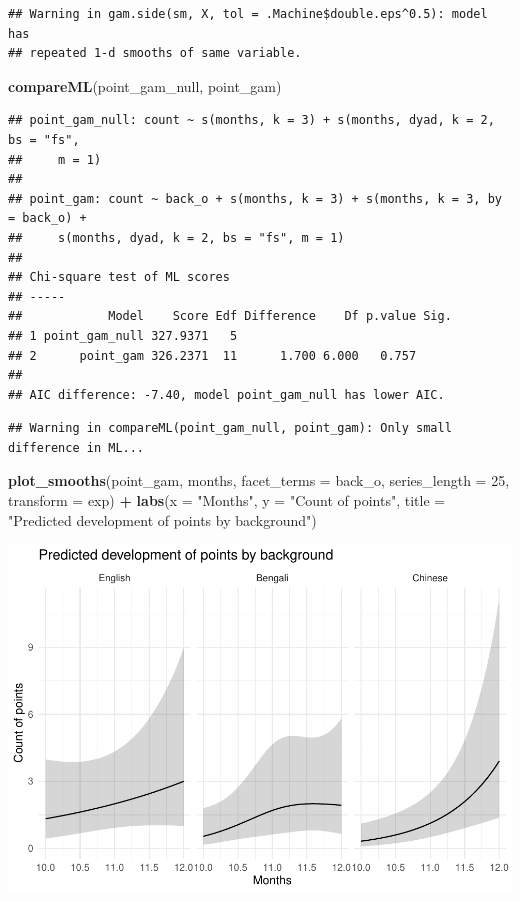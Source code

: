\documentclass[]{article}
\newenvironment{Shaded}{\begin{snugshade}}{\end{snugshade}}
\newcommand{\DataTypeTok}[1]{\textcolor[rgb]{0.13,0.29,0.53}{#1}}
\newcommand{\DecValTok}[1]{\textcolor[rgb]{0.00,0.00,0.81}{#1}}
\newcommand{\KeywordTok}[1]{\textcolor[rgb]{0.13,0.29,0.53}{\textbf{#1}}}
\newcommand{\NormalTok}[1]{#1}
\newcommand{\OperatorTok}[1]{\textcolor[rgb]{0.81,0.36,0.00}{\textbf{#1}}}
\newcommand{\StringTok}[1]{\textcolor[rgb]{0.31,0.60,0.02}{#1}}
\begin{document}
\begin{verbatim}
## Warning in gam.side(sm, X, tol = .Machine$double.eps^0.5): model has
## repeated 1-d smooths of same variable.
\end{verbatim}

\begin{Shaded}
\begin{Highlighting}[]
\KeywordTok{compareML}\NormalTok{(point_gam_null, point_gam)}
\end{Highlighting}
\end{Shaded}

\begin{verbatim}
## point_gam_null: count ~ s(months, k = 3) + s(months, dyad, k = 2, bs = "fs", 
##     m = 1)
## 
## point_gam: count ~ back_o + s(months, k = 3) + s(months, k = 3, by = back_o) + 
##     s(months, dyad, k = 2, bs = "fs", m = 1)
## 
## Chi-square test of ML scores
## -----
##            Model    Score Edf Difference    Df p.value Sig.
## 1 point_gam_null 327.9371   5                              
## 2      point_gam 326.2371  11      1.700 6.000   0.757     
## 
## AIC difference: -7.40, model point_gam_null has lower AIC.
\end{verbatim}

\begin{verbatim}
## Warning in compareML(point_gam_null, point_gam): Only small difference in ML...
\end{verbatim}

\begin{Shaded}
\begin{Highlighting}[]
\KeywordTok{plot_smooths}\NormalTok{(point_gam, months, }\DataTypeTok{facet_terms =}\NormalTok{ back_o, }\DataTypeTok{series_length =} \DecValTok{25}\NormalTok{, }\DataTypeTok{transform =}\NormalTok{ exp) }\OperatorTok{+}
\StringTok{  }\KeywordTok{labs}\NormalTok{(}\DataTypeTok{x =} \StringTok{"Months"}\NormalTok{, }\DataTypeTok{y =} \StringTok{"Count of points"}\NormalTok{, }\DataTypeTok{title =} \StringTok{"Predicted development of points by background"}\NormalTok{)}
\end{Highlighting}
\end{Shaded}

\includegraphics{supplement_files/figure-latex/point-gam-plot-1.pdf}
\end{document}

